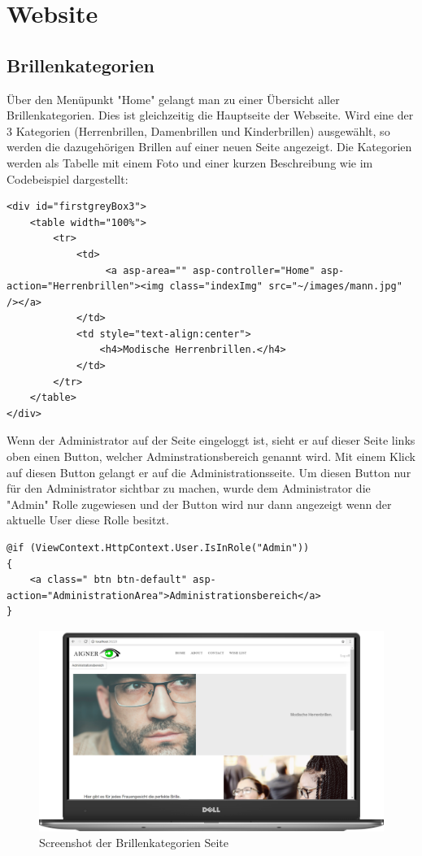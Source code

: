 \section{Website}
\subsection{Brillenkategorien}
Über den Menüpunkt "Home" gelangt man zu einer Übersicht aller Brillenkategorien. Dies ist gleichzeitig die Hauptseite der Webseite. Wird eine der 3 Kategorien (Herrenbrillen, Damenbrillen und Kinderbrillen) ausgewählt, so werden die dazugehörigen Brillen auf einer neuen Seite angezeigt.
Die Kategorien werden als Tabelle mit einem Foto und einer kurzen Beschreibung wie im Codebeispiel dargestellt:
\begin{lstlisting}
<div id="firstgreyBox3">
    <table width="100%">
        <tr>
            <td>
                 <a asp-area="" asp-controller="Home" asp-action="Herrenbrillen"><img class="indexImg" src="~/images/mann.jpg" /></a> 
            </td>
            <td style="text-align:center">
                <h4>Modische Herrenbrillen.</h4>
            </td>
        </tr>
    </table>
</div>
\end{lstlisting}
Wenn der Administrator auf der Seite eingeloggt ist, sieht er auf dieser Seite links oben einen Button, welcher Adminstrationsbereich genannt wird. Mit einem Klick auf diesen Button gelangt er auf die Administrationsseite. Um diesen Button nur für den Administrator sichtbar zu machen, wurde dem Administrator die "Admin" Rolle zugewiesen und der Button wird nur dann angezeigt wenn der aktuelle User diese Rolle besitzt.

\begin{lstlisting}
@if (ViewContext.HttpContext.User.IsInRole("Admin"))
{
    <a class=" btn btn-default" asp-action="AdministrationArea">Administrationsbereich</a>
}
\end{lstlisting}


\begin{figure}[H]
\begin{center}
	\includegraphics[scale=.2]{images/Index.png}
\end{center}
	\caption{Screenshot der Brillenkategorien Seite}
	\label{fig:sample}
\end{figure}

